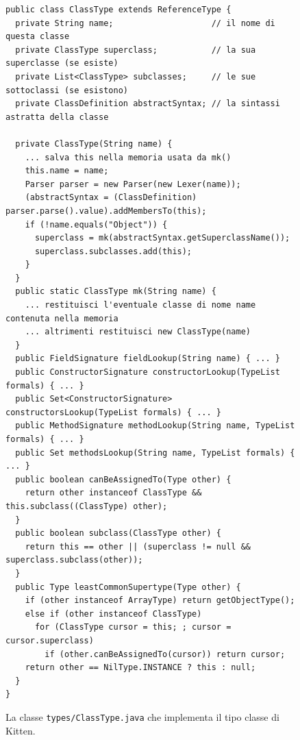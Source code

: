 \begin{figure}[t]
{\scriptsize
\begin{verbatim}
public class ClassType extends ReferenceType {
  private String name;                    // il nome di questa classe
  private ClassType superclass;           // la sua superclasse (se esiste)
  private List<ClassType> subclasses;     // le sue sottoclassi (se esistono)
  private ClassDefinition abstractSyntax; // la sintassi astratta della classe

  private ClassType(String name) {
    ... salva this nella memoria usata da mk()
    this.name = name;
    Parser parser = new Parser(new Lexer(name));
    (abstractSyntax = (ClassDefinition) parser.parse().value).addMembersTo(this);
    if (!name.equals("Object")) {
      superclass = mk(abstractSyntax.getSuperclassName());
      superclass.subclasses.add(this);
    }
  }
  public static ClassType mk(String name) {
    ... restituisci l'eventuale classe di nome name contenuta nella memoria
    ... altrimenti restituisci new ClassType(name)
  }
  public FieldSignature fieldLookup(String name) { ... }
  public ConstructorSignature constructorLookup(TypeList formals) { ... }
  public Set<ConstructorSignature> constructorsLookup(TypeList formals) { ... }
  public MethodSignature methodLookup(String name, TypeList formals) { ... }
  public Set methodsLookup(String name, TypeList formals) { ... }
  public boolean canBeAssignedTo(Type other) {
    return other instanceof ClassType && this.subclass((ClassType) other);
  }
  public boolean subclass(ClassType other) {
    return this == other || (superclass != null && superclass.subclass(other));
  }
  public Type leastCommonSupertype(Type other) {
    if (other instanceof ArrayType) return getObjectType();
    else if (other instanceof ClassType)
      for (ClassType cursor = this; ; cursor = cursor.superclass)
        if (other.canBeAssignedTo(cursor)) return cursor;
    return other == NilType.INSTANCE ? this : null;
  }
}
\end{verbatim}
}
\caption{La classe \texttt{types/ClassType.java} che implementa il tipo classe di Kitten.}
  \label{fig:types.ClassType}
\end{figure}

